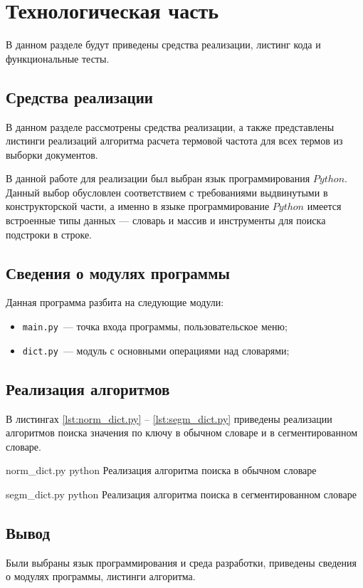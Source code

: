 \chapter{Технологическая часть}
В данном разделе будут приведены средства реализации, листинг кода и функциональные тесты.

\section{Средства реализации}

В данном разделе рассмотрены средства реализации, а также представлены листинги реализаций алгоритма расчета термовой частота для всех термов из выборки документов.

В данной работе для реализации был выбран язык программирования $Python$. 
Данный выбор обусловлен соответствием с требованиями выдвинутыми в конструкторской части, а именно в языке программирование $Python$ имеется встроенные типы данных --- словарь и массив и инструменты для поиска подстроки в строке.

\section{Сведения о модулях программы}

Данная программа разбита на следующие модули:

\begin{itemize}
    \item \texttt{main.py}~--- точка входа программы, пользовательское меню;
    \item \texttt{dict.py}~--- модуль с основными операциями над словарями;
\end{itemize}

\clearpage

\section{Реализация алгоритмов}

В листингах \ref{lst:norm_dict.py} -- \ref{lst:segm_dict.py} приведены реализации алгоритмов поиска значения по ключу в обычном словаре и в сегментированном словаре. 


    {norm_dict.py}
    {python}
    {Реализация алгоритма поиска в обычном словаре}

    {segm_dict.py}
    {python}
    {Реализация алгоритма поиска в сегментированном словаре}

\section*{Вывод}
Были выбраны язык программирования и среда разработки, приведены сведения о модулях программы, листинги алгоритма.